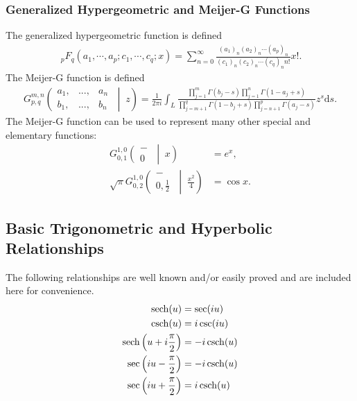 \subsubsection{Generalized Hypergeometric and Meijer-G Functions}
The generalized hypergeometric function is defined
\begin{align}
	\ {}_{p}F_{q}
	\left(a_1, \cdots, a_p; c_1, \cdots, c_q; x\right) = 
	\sum_{n=0}^{\infty}
	\frac{(a_1)_n (a_2)_n \cdots (a_p)_n}{(c_1)_n (c_2)_n \cdots (c_q)_n n!} x!.
\end{align}
The Meijer-G function is defined
\begin{align}
	G_{p,q}^{m,n}
	\left(
	\begin{matrix}
		a_1, & ..., & a_n \\
		b_1, & ..., & b_n
	\end{matrix}\;\middle|\;z
	\right) =
	\frac{1}{2 \pi i}
	\int_L
	\frac{\prod_{j=1}^m\Gamma(b_j-s)\prod_{j=1}^n\Gamma(1 - a_j + s)}
	{\prod_{j=m+1}^q\Gamma(1-b_j+s)\prod_{j=n+1}^p\Gamma(a_j - s)}
	z^s \mathrm{d}s.
\end{align}
The Meijer-G function can be used to represent many other special and elementary functions:
\begin{align}
G_{0,1}^{1,0}
\left(\begin{matrix}-\\0\end{matrix}\;\middle|\;x\right) &= e^x,\\
\sqrt{\pi}G_{0,2}^{1,0}\left(\begin{matrix}-\\0,\frac{1}{2}\end{matrix}\;\middle|\;\frac{x^2}{4}\right) &= \cos x.
\end{align}

\subsection{Basic Trigonometric and Hyperbolic Relationships}

The following relationships are well known and/or easily proved and are included here for convenience.
\begin{align}
	\operatorname{sech}(u) &= \sec(iu) \\
	\operatorname{csch}(u) &= i\csc(iu) \\
	\operatorname{sech}\left(u + i\frac{\pi}{2}\right) &= -i\operatorname{csch}(u) \\
	\sec\left(iu - \frac{\pi}{2}\right) &= -i \operatorname{csch}(u) \\
	\sec\left(iu + \frac{\pi}{2}\right) &= i \operatorname{csch}(u)
\end{align}

